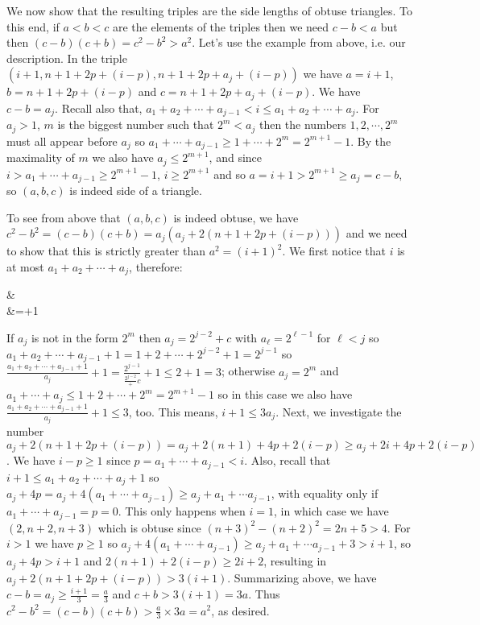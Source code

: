 \documentclass[11pt,a4paper]{article}
\begin{document}
\begin{enumerate}
	We now show that the resulting triples are the side lengths of obtuse triangles. To this end, if $a<b<c$ are the elements of the triples then we need $c-b<a$ but then $(c-b)(c+b)=c^2-b^2>a^2$. 
	Let's use the example from above, i.e. our description. In the triple $(i+1, n+1+2p+(i-p), n+1+2p+a_j+(i-p))$ we have $a=i+1$, $b=n+1+2p+(i-p)$ and $c=n+1+2p+a_j+(i-p)$. 
	We have $c-b=a_j$. 
	Recall also that, $a_1+a_2+\cdots + a_{j-1}<i\le a_1+a_2+\cdots + a_j$. 
	For $a_j>1$, $m$ is the biggest number such that $2^m<a_j$ then the numbers $1, 2, \cdots , 2^{m}$ must all appear before $a_j$ so $a_1+\cdots + a_{j-1}\ge 1+\cdots + 2^{m}=2^{m+1}-1$. 
	By the maximality of $m$ we also have $a_j\le 2^{m+1}$, and since $i>a_1+\cdots + a_{j-1}\ge 2^{m+1}-1$, $i\ge 2^{m+1}$ and so $a=i+1>2^{m+1}\ge a_j=c-b$, so $(a, b, c)$ is indeed side of a triangle. 
	
	To see from above that $(a, b, c)$ is indeed obtuse, we have 
	$c^2-b^2=(c-b)(c+b)=a_j(a_j+2(n+1+2p+(i-p)))$ and we need to show that this is strictly greater than $a^2=(i+1)^2$. We first notice that $i$ is at most $a_1+a_2+\cdots + a_j$, therefore: 
	\begin{flalign*}
		&\le {}
		\\&=+1
	\end{flalign*}
	If $a_j$ is not in the form $2^m$ then $a_j=2^{j-2}+c$ with $a_{\ell}=2^{\ell-1}$ for $\ell<j$ so $a_1+a_2+\cdots + a_{j-1} + 1=1+2+\cdots + 2^{j-2}+1=2^{j-1}$ so $\frac{a_1+a_2+\cdots + a_{j-1} + 1}{a_j}+1=\frac{2^{j-1}}{\frac{2^{j-2}}+c}+1\le 2+1=3$;
	otherwise $a_j=2^m$ and $a_1+\cdots +a_j\le 1+2+\cdots +2^{m}=2^{m+1}-1$ so in this case we also have 
	$\frac{a_1+a_2+\cdots + a_{j-1} + 1}{a_j}+1\le 3$, too. 
	This means, $i+1\le 3a_j$. 
	Next, we investigate the number $a_j+2(n+1+2p+(i-p))=a_j+2(n+1)+4p+2(i-p)\ge a_j+2i+4p+2(i-p)$. 
	We have $i-p\ge 1$ since $p=a_1+\cdots +a_{j-1}<i$. 
	Also, recall that $i+1\le a_1+a_2+\cdots + a_j + 1$ so 
	$a_j+4p=a_j+4(a_1+\cdots + a_{j-1})\ge a_j+a_1+\cdots a_{j-1}$, with equality only if $a_1+\cdots + a_{j-1}=p=0$. This only happens when $i=1$, in which case we have $(2, n+2, n+3)$ which is obtuse since $(n+3)^2-(n+2)^2=2n+5>4$. 
	For $i>1$ we have $p\ge 1$ so $a_j+4(a_1+\cdots + a_{j-1}) \ge a_j+a_1+\cdots a_{j-1} + 3>i+1$, so 
	$a_j+4p>i+1$ and $2(n+1)+2(i-p)\ge 2i+2$, resulting in $a_j+2(n+1+2p+(i-p))>3(i+1)$. 
	Summarizing above, we have $c-b=a_j\ge \frac{i+1}{3}=\frac{a}{3}$ and $c+b>3(i+1)=3a$. 
	Thus $c^2-b^2=(c-b)(c+b)>\frac{a}{3}\times 3a=a^2$, as desired. 
	

\end{enumerate}
\end{document}
